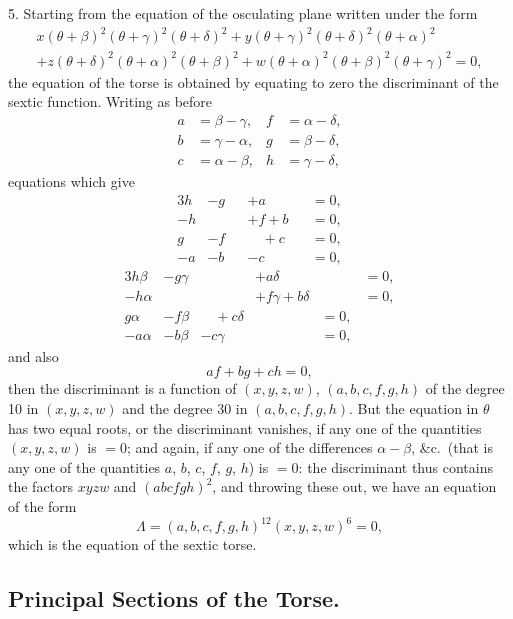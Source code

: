 \documentclass[11pt,a4paper]{article}
\begin{document}
5. Starting from the equation of the osculating plane written under the form
\begin{multline*}
x(\theta + \beta)^2(\theta + \gamma)^2(\theta + \delta)^2
+ y(\theta + \gamma)^2(\theta + \delta)^2(\theta + \alpha)^2 \\
+ z(\theta + \delta)^2(\theta + \alpha)^2(\theta + \beta)^2
+ w(\theta + \alpha)^2(\theta + \beta)^2(\theta + \gamma)^2 = 0,
\end{multline*}
the equation of the torse is obtained by equating to zero the discriminant of the sextic function. Writing as before
\begin{align*}
a &= \beta - \gamma, & f &= \alpha - \delta, \\
b &= \gamma - \alpha, & g &= \beta - \delta, \\
c &= \alpha - \beta, & h &= \gamma - \delta,
\end{align*}
equations which give
\begin{alignat*}{3}
h &- g &&+ a &&= 0, \\
-h &\quad &&+ f + b &&= 0, \\
g &- f &&\quad + c &&= 0, \\
-a &- b &&- c &&= 0,
\end{alignat*}
\begin{alignat*}{3}
h\beta &- g\gamma &&+ a\delta &&= 0, \\
-h\alpha &\quad &&+ f\gamma + b\delta &&= 0, \\
g\alpha &- f\beta &\quad + c\delta &&= 0, \\
-a\alpha &- b\beta &- c\gamma &\quad\quad &= 0,
\end{alignat*}
and also
\[
af + bg + ch = 0,
\]
then the discriminant is a function of $(x, y, z, w)$, $(a, b, c, f, g, h)$ of the degree 10 in $(x, y, z, w)$ and the degree 30 in $(a, b, c, f, g, h)$. But the equation in $\theta$ has two equal roots, or the discriminant vanishes, if any one of the quantities $(x, y, z, w)$ is $= 0$; and again, if any one of the differences $\alpha - \beta$, \&c.\ (that is any one of the quantities $a$, $b$, $c$, $f$, $g$, $h$) is $= 0$: the discriminant thus contains the factors $xyzw$ and $(abcfgh)^2$, and throwing these out, we have an equation of the form
\[
\Lambda = (a, b, c, f, g, h)^{12}(x, y, z, w)^6 = 0,
\]
which is the equation of the sextic torse.

\subsection*{Principal Sections of the Torse.}
\end{document}
